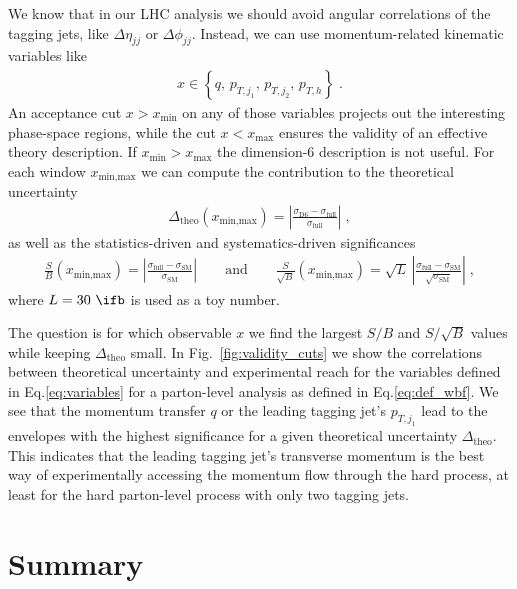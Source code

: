 We know that in our LHC analysis we should avoid angular correlations
of the tagging jets, like $\Delta \eta_{jj}$ or $\Delta
\phi_{jj}$. Instead, we can use momentum-related kinematic variables
like
%
\begin{align}
 x \in \left\{  q, \, p_{T,j_1}, \, p_{T,j_2}, \, p_{T,h} \right\} \; .
\label{eq:variables}
\end{align}
%
An acceptance cut $x > x_\text{min}$ on any of those variables
projects out the interesting phase-space regions, while the cut $x <
x_\text{max}$ ensures the validity of an effective theory
description. If $x_\text{min} > x_\text{max}$ the dimension-6
description is not useful. For each window $x_\text{min,max}$ we can
compute the contribution to the theoretical uncertainty
%
\begin{align}
  \Delta_\text{theo} (x_\text{min,max}) 
= \left| \frac {\sigma_\text{D6} - \sigma_\text{full}} {\sigma_\text{full}} \right| \; ,
\label{eq:err_th}
\end{align} 
%
as well as the statistics-driven and systematics-driven significances
%
\begin{align}
  \frac{S}{B} (x_\text{min,max}) 
= \left| \frac {\sigma_\text{full} - \sigma_\text{SM}} {\sigma_\text{SM}} \right| 
\qquad \text{and} \qquad 
  \frac{S}{\sqrt{B}} (x_\text{min,max}) 
= \sqrt{L} \, \left| \frac {\sigma_\text{full} - \sigma_\text{SM}} {\sqrt{\sigma_\text{SM}}} \right| \; ,
\label{eq:err_ex}
\end{align}
%
where $L = 30~\ifb$ is used as a toy number.

The question is for which
observable $x$ we find the largest $S/B$ and $S/\sqrt{B}$ values while
keeping $\Delta_\text{theo}$ small.  In Fig.~\ref{fig:validity_cuts} we show
the correlations between theoretical uncertainty and experimental
reach for the variables defined in Eq.\;\eqref{eq:variables} for a
parton-level analysis as defined in Eq.\;\eqref{eq:def_wbf}. We see
that the momentum transfer $q$ or the leading tagging jet's
$p_{T,j_1}$ lead to the envelopes with the highest significance for a
given theoretical uncertainty $\Delta_\text{theo}$. This indicates
that the leading tagging jet's transverse momentum is the best way of
experimentally accessing the momentum flow through the hard process,
at least for the hard parton-level process with only two tagging
jets.





\section{Summary}
\label{sec:validity_summary}

